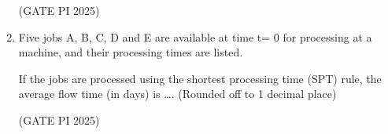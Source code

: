 \documentclass[journal,12pt,onecolumn]{IEEEtran}
\theoremstyle{remark}
\begin{document}
\begin{enumerate}
\hfill (GATE PI 2025)

\item Five jobs A, B, C, D and E are available at time t= 0 for processing at a machine, and their processing times are listed.



If the jobs are processed using the shortest processing time (SPT) rule, the average flow time (in days) is \dots . (Rounded off to 1 decimal place)

\hfill (GATE PI 2025)













\end{enumerate}
\end{document}
